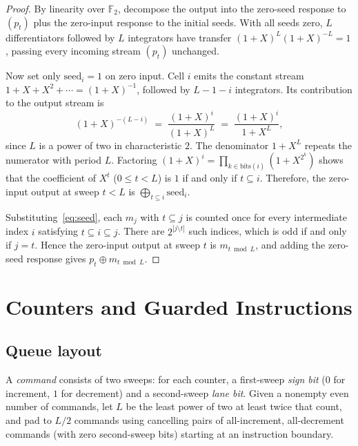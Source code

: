 \documentclass{article}
\theoremstyle{definition}
\theoremstyle{remark}
\newcommand{\Ftwo}{\mathbb{F}_2}
\begin{document}
\begin{proof}
By linearity over $\Ftwo$, decompose the output into the zero-seed response to $(p_t)$ plus the zero-input response to the initial seeds.
With all seeds zero, $L$ differentiators followed by $L$ integrators have transfer $(1+X)^L (1+X)^{-L} = 1$, passing every incoming stream $(p_t)$ unchanged.

Now set only $\mathrm{seed}_i = 1$ on zero input.
Cell $i$ emits the constant stream $1 + X + X^2 + \cdots = (1+X)^{-1}$, followed by $L - 1 - i$ integrators.
Its contribution to the output stream is
\[
(1+X)^{-(L-i)} \;=\; \frac{(1+X)^i}{(1+X)^L} \;=\; \frac{(1+X)^i}{1 + X^L},
\]
since $L$ is a power of two in characteristic $2$.
The denominator $1 + X^L$ repeats the numerator with period $L$.
Factoring $(1+X)^i = \prod_{k \in \mathrm{bits}(i)} (1 + X^{2^k})$ shows that the coefficient of $X^t$ ($0 \le t < L$) is $1$ if and only if $t \subseteq i$.
Therefore, the zero-input output at sweep $t < L$ is $\bigoplus_{t \subseteq i} \mathrm{seed}_i$.

Substituting~\eqref{eq:seed}, each $m_j$ with $t \subseteq j$ is counted once for every intermediate index $i$ satisfying $t \subseteq i \subseteq j$.
There are $2^{|j \setminus t|}$ such indices, which is odd if and only if $j = t$.
Hence the zero-input output at sweep $t$ is $m_{t \bmod L}$, and adding the zero-seed response gives $p_t \oplus m_{t \bmod L}$.
\end{proof}

\section{Counters and Guarded Instructions}

\subsection{Queue layout}

A \emph{command} consists of two sweeps: for each counter, a first-sweep \emph{sign bit} ($0$ for increment, $1$ for decrement) and a second-sweep \emph{lane bit}.
Given a nonempty even number of commands, let $L$ be the least power of two at least twice that count, and pad to $L/2$ commands using cancelling pairs of all-increment, all-decrement commands (with zero second-sweep bits) starting at an instruction boundary.
\end{document}
